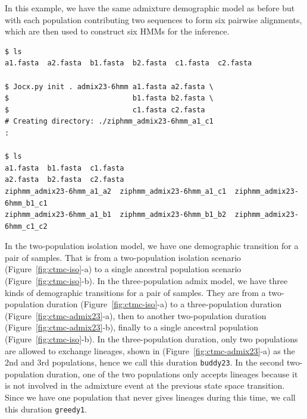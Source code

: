 \documentclass[graybox]{svmult}
\begin{document}
In this example, we have the same admixture demographic model as before but with each population contributing two sequences to form six pairwise alignments, which are then used to construct six HMMs for the inference.

 {\scriptsize{}\begin{verbatim}
$ ls
a1.fasta  a2.fasta  b1.fasta  b2.fasta  c1.fasta  c2.fasta

$ Jocx.py init . admix23-6hmm a1.fasta a2.fasta \
$                             b1.fasta b2.fasta \
$                             c1.fasta c2.fasta
# Creating directory: ./ziphmm_admix23-6hmm_a1_c1
:

$ ls
a1.fasta  b1.fasta  c1.fasta
a2.fasta  b2.fasta  c2.fasta
ziphmm_admix23-6hmm_a1_a2  ziphmm_admix23-6hmm_a1_c1  ziphmm_admix23-6hmm_b1_c1
ziphmm_admix23-6hmm_a1_b1  ziphmm_admix23-6hmm_b1_b2  ziphmm_admix23-6hmm_c1_c2
\end{verbatim}}


In the two-population isolation model, we have one demographic transition for a pair of samples.  That is from a two-population isolation scenario (Figure~\ref{fig:ctmc-iso}-a) to a single ancestral population scenario (Figure~\ref{fig:ctmc-iso}-b).  In the three-population admix model, we have three kinds of demographic transitions for a pair of samples.  They are from a two-population duration (Figure~\ref{fig:ctmc-iso}-a) to a three-population duration (Figure~\ref{fig:ctmc-admix23}-a), then to another two-population duration (Figure~\ref{fig:ctmc-admix23}-b), finally to a single ancestral population (Figure~\ref{fig:ctmc-iso}-b).  In the three-population duration, only two populations are allowed to exchange lineages, shown in (Figure~\ref{fig:ctmc-admix23}-a) as the 2nd and 3rd populations, hence we call this duration \texttt{buddy23}.  In the second two-population duration, one of the two populations only accepts lineages because it is not involved in the admixture event at the previous state space transition.   Since we have one population that never gives lineages during this time, we call this duration \texttt{greedy1}.
\end{document}
